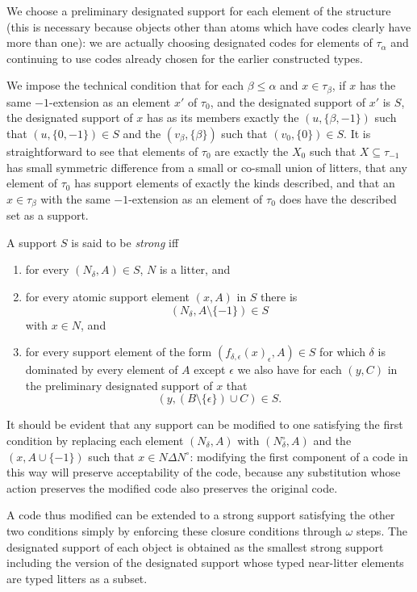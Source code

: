 \documentclass[12pt]{article}
\begin{document}
\begin{enumerate}
We choose a preliminary designated support for each element of the structure (this is necessary because objects other than atoms which have codes clearly have more than one):  we are actually
choosing designated codes for elements of $\tau_\alpha$ and continuing to use codes already chosen for the earlier constructed types.

We impose the technical condition that for each $\beta \leq \alpha$ and $x \in \tau_\beta$, if $x$ has the same $-1$-extension as an element $x'$  of $\tau_0$, and the designated support of $x'$ is $S$, the designated support of $x$ has as its members exactly the $(u,\{\beta,-1\})$ such that $(u,\{0,-1\}) \in S$ and the $(v_\beta,\{\beta\})$ such
that $(v_0,\{0\})\in S$.  It is straightforward to see that elements of $\tau_0$ are exactly the $X_0$ such that $X \subseteq \tau_{-1}$ has small symmetric difference from a small or co-small union of litters, that any element of $\tau_0$ has support elements of exactly the kinds described, and that an $x \in \tau_\beta$ with the same $-1$-extension as
an element of $\tau_0$ does have the described set as a support.

A support $S$ is said to be {\em strong\/} iff

\begin{enumerate}

\item for every $(N_\delta,A) \in S$, $N$ is a litter, and
\item  for every atomic support element $(x,A)$ in $S$ there is $$(N_\delta,A\setminus\{-1\}) \in S$$ with $x \in N$, and 

\item for every support element of the form $(f_{\delta,\epsilon}(x)_\epsilon,A) \in S$ for which $\delta$ is dominated by every element of $A$ except $\epsilon$ we also have for each $(y,C)$ in the preliminary designated support
of $x$ that $$(y,(B \setminus \{\epsilon\})\cup C)\in S.$$

\end{enumerate}  It should be evident that any support can be modified to one satisfying the first condition by replacing each element
$(N_\delta,A)$ with $(N^\circ_\delta,A)$ and the $(x,A\cup \{-1\})$ such that $x \in N \Delta N^\circ$:  modifying the first component of a code
in this way will preserve acceptability of the code, because any substitution whose action preserves the modified code also preserves the original code.

A code thus modified can be extended to a strong support satisfying the other two conditions simply by enforcing these closure conditions through $\omega$ steps.  The designated support  of each object is obtained as the  smallest strong support including the version of the designated support whose typed near-litter elements are typed litters  as a subset.


\end{enumerate}
\end{document}
